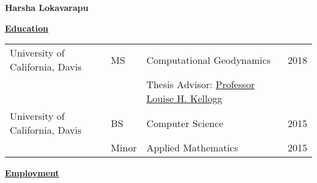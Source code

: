 \documentclass[11pt]{ltxdoc}
\begin{document}
\begin{center}
  \textbf{Harsha Lokavarapu}
\end{center}
\vskip -10pt

\textbf{\underline{Education}}

\vskip -06pt

\begin{tabular}{llll}
University of California, Davis              &MS       &Computational Geodynamics      & 2018 \\
                                             &       &Thesis Advisor: \href{http://geology.ucdavis.edu/people/faculty/kellogg.php}{Professor Louise H. Kellogg}        &  \\
University of California, Davis              &BS      & Computer Science                         & 2015       \\
                                             &Minor   & Applied Mathematics                      & 2015
\end{tabular}


\vskip -10pt

\textbf{\underline{Employment}}
\end{document}
